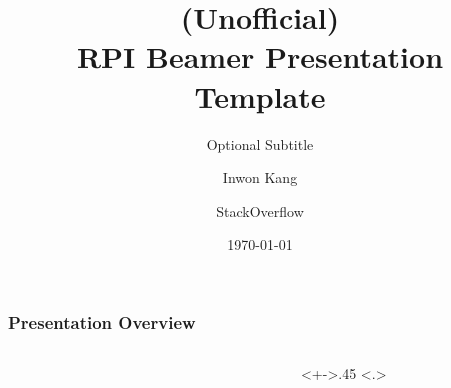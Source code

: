 \documentclass[
	11pt, %
	aspectratio=169, %
]{beamer}
\title[A Short Title for Your Slides]{(Unofficial)\\RPI Beamer Presentation Template}
\subtitle{Optional Subtitle} %
\author[]{Inwon Kang \and StackOverflow} %
\institute[RPI]{Department of Computer Science}
\date[\today]{\today}
\begin{document}
\begin{frame}[plain]
	\titlepage %
\end{frame}



\begin{frame}[noframenumbering]
	\frametitle{Presentation Overview} %

  \begin{columns}[t]
      \begin{column}{.1\textwidth}
      \end{column}
    \begin{column}{.45\textwidth}
      \tableofcontents[
        pausesections,
        sections={-4}
    ]
    \end{column}
    \begin{column}<+->{.45\textwidth}
      \only<.>{\setcounter{tocseccounter}{\slideinframe}}
      \advanceslidecounter{-\thetocseccounter}
      \tableofcontents[
        pausesections,
        sections={5-}
      ]
    \end{column}
  \end{columns}


\end{frame}
\end{document}
